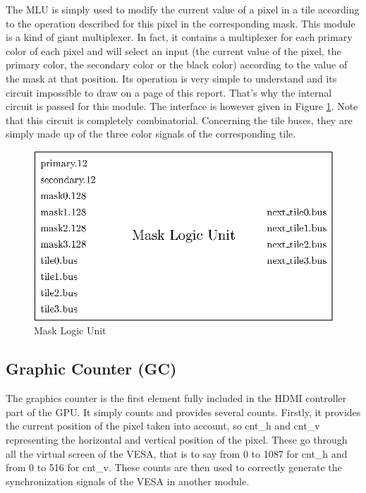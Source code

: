 The MLU is simply used to modify the current value of a pixel in a tile according to the operation 
described for this pixel in the corresponding mask. This module is a kind of giant multiplexer. In 
fact, it contains a multiplexer for each primary color of each pixel and will select an input 
(the current value of the pixel, the primary color, the secondary color or the black color) 
according to the value of the mask at that position. Its operation is very simple to understand 
and its circuit impossible to draw on a page of this report. That's why the internal circuit is 
passed for this module. The interface is however given in Figure \ref{fig:gpu/mlu}.
Note that this circuit is completely combinatorial. Concerning the tile buses, they are simply
made up of the three color signals of the corresponding tile.

\begin{figure}[H]
    \centering
    \includegraphics[scale=1.0]{Chapter4-GPU_CLKU/res/mlu}
    \caption{Mask Logic Unit}
    \label{fig:gpu/mlu}
\end{figure}

\subsection{Graphic Counter (GC)}

The graphics counter is the first element fully included in the HDMI controller part of the GPU. 
It simply counts and provides several counts. Firstly, it provides the current position of the 
pixel taken into account, so cnt\_h and cnt\_v representing the horizontal and vertical position 
of the pixel. These go through all the virtual screen of the VESA, that is to say from 0 to 1087 
for cnt\_h and from 0 to 516 for cnt\_v. These counts are then used to correctly generate the 
synchronization signals of the VESA in another module. 

